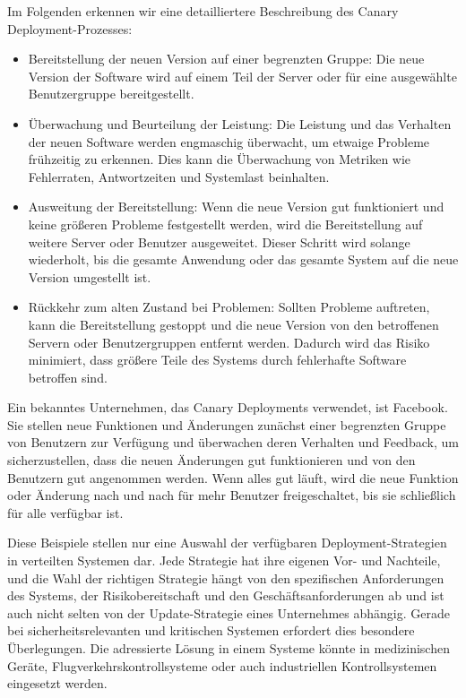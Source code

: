 \begin{itemize}
Im Folgenden erkennen wir eine detailliertere Beschreibung des Canary Deployment-Prozesses:
\begin{itemize} 
\item Bereitstellung der neuen Version auf einer begrenzten Gruppe: Die neue Version der Software wird auf einem Teil der Server oder für eine ausgewählte Benutzergruppe bereitgestellt.
\item Überwachung und Beurteilung der Leistung: Die Leistung und das Verhalten der neuen Software werden engmaschig überwacht, um etwaige Probleme frühzeitig zu erkennen. Dies kann die Überwachung von Metriken wie Fehlerraten, Antwortzeiten und Systemlast beinhalten.
\item Ausweitung der Bereitstellung: Wenn die neue Version gut funktioniert und keine größeren Probleme festgestellt werden, wird die Bereitstellung auf weitere Server oder Benutzer ausgeweitet. Dieser Schritt wird solange wiederholt, bis die gesamte Anwendung oder das gesamte System auf die neue Version umgestellt ist.
\item Rückkehr zum alten Zustand bei Problemen: Sollten Probleme auftreten, kann die Bereitstellung gestoppt und die neue Version von den betroffenen Servern oder Benutzergruppen entfernt werden. Dadurch wird das Risiko minimiert, dass größere Teile des Systems durch fehlerhafte Software betroffen sind.
\end{itemize} 
Ein bekanntes Unternehmen, das Canary Deployments verwendet, ist Facebook. Sie stellen neue Funktionen und Änderungen zunächst einer begrenzten Gruppe von Benutzern zur Verfügung und überwachen deren Verhalten und Feedback, um sicherzustellen, dass die neuen Änderungen gut funktionieren und von den Benutzern gut angenommen werden. Wenn alles gut läuft, wird die neue Funktion oder Änderung nach und nach für mehr Benutzer freigeschaltet, bis sie schließlich für alle verfügbar ist.
\end{itemize} 
Diese Beispiele stellen nur eine Auswahl der verfügbaren Deployment-Strategien in verteilten Systemen dar. Jede Strategie hat ihre eigenen Vor- und Nachteile, und die Wahl der richtigen Strategie hängt von den spezifischen Anforderungen des Systems, der Risikobereitschaft und den Geschäftsanforderungen ab und ist auch nicht selten von der Update-Strategie eines Unternehmes abhängig. Gerade bei sicherheitsrelevanten und kritischen Systemen erfordert dies besondere Überlegungen. 
Die adressierte Lösung in einem Systeme könnte in medizinischen Geräte, Flugverkehrskontrollsysteme oder auch industriellen Kontrollsystemen eingesetzt werden. 
